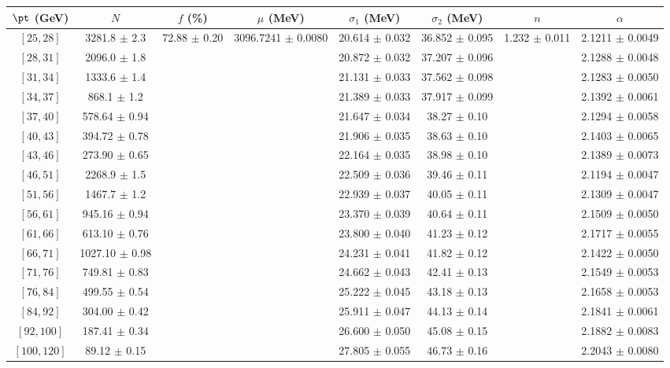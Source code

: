\begin{tabular}{c||c|c|c|c|c|c|c}
$\pt$ (GeV) & $N$ & $f$ (\%) & $\mu$ (MeV) & $\sigma_1$ (MeV) & $\sigma_2$ (MeV) & $n$ & $\alpha$ \\
\hline
$[25, 28]$ & 3281.8 $\pm$ 2.3 & \multirow{17}{*}{72.88 $\pm$ 0.20} & \multirow{17}{*}{3096.7241 $\pm$ 0.0080} & 20.614 $\pm$ 0.032 & 36.852 $\pm$ 0.095 & \multirow{17}{*}{1.232 $\pm$ 0.011} & 2.1211 $\pm$ 0.0049\\
$[28, 31]$ & 2096.0 $\pm$ 1.8 &  &  & 20.872 $\pm$ 0.032 & 37.207 $\pm$ 0.096 &  & 2.1288 $\pm$ 0.0048\\
$[31, 34]$ & 1333.6 $\pm$ 1.4 &  &  & 21.131 $\pm$ 0.033 & 37.562 $\pm$ 0.098 &  & 2.1283 $\pm$ 0.0050\\
$[34, 37]$ & 868.1 $\pm$ 1.2 &  &  & 21.389 $\pm$ 0.033 & 37.917 $\pm$ 0.099 &  & 2.1392 $\pm$ 0.0061\\
$[37, 40]$ & 578.64 $\pm$ 0.94 &  &  & 21.647 $\pm$ 0.034 & 38.27 $\pm$ 0.10 &  & 2.1294 $\pm$ 0.0058\\
$[40, 43]$ & 394.72 $\pm$ 0.78 &  &  & 21.906 $\pm$ 0.035 & 38.63 $\pm$ 0.10 &  & 2.1403 $\pm$ 0.0065\\
$[43, 46]$ & 273.90 $\pm$ 0.65 &  &  & 22.164 $\pm$ 0.035 & 38.98 $\pm$ 0.10 &  & 2.1389 $\pm$ 0.0073\\
$[46, 51]$ & 2268.9 $\pm$ 1.5 &  &  & 22.509 $\pm$ 0.036 & 39.46 $\pm$ 0.11 &  & 2.1194 $\pm$ 0.0047\\
$[51, 56]$ & 1467.7 $\pm$ 1.2 &  &  & 22.939 $\pm$ 0.037 & 40.05 $\pm$ 0.11 &  & 2.1309 $\pm$ 0.0047\\
$[56, 61]$ & 945.16 $\pm$ 0.94 &  &  & 23.370 $\pm$ 0.039 & 40.64 $\pm$ 0.11 &  & 2.1509 $\pm$ 0.0050\\
$[61, 66]$ & 613.10 $\pm$ 0.76 &  &  & 23.800 $\pm$ 0.040 & 41.23 $\pm$ 0.12 &  & 2.1717 $\pm$ 0.0055\\
$[66, 71]$ & 1027.10 $\pm$ 0.98 &  &  & 24.231 $\pm$ 0.041 & 41.82 $\pm$ 0.12 &  & 2.1422 $\pm$ 0.0050\\
$[71, 76]$ & 749.81 $\pm$ 0.83 &  &  & 24.662 $\pm$ 0.043 & 42.41 $\pm$ 0.13 &  & 2.1549 $\pm$ 0.0053\\
$[76, 84]$ & 499.55 $\pm$ 0.54 &  &  & 25.222 $\pm$ 0.045 & 43.18 $\pm$ 0.13 &  & 2.1658 $\pm$ 0.0053\\
$[84, 92]$ & 304.00 $\pm$ 0.42 &  &  & 25.911 $\pm$ 0.047 & 44.13 $\pm$ 0.14 &  & 2.1841 $\pm$ 0.0061\\
$[92, 100]$ & 187.41 $\pm$ 0.34 &  &  & 26.600 $\pm$ 0.050 & 45.08 $\pm$ 0.15 &  & 2.1882 $\pm$ 0.0083\\
$[100, 120]$ & 89.12 $\pm$ 0.15 &  &  & 27.805 $\pm$ 0.055 & 46.73 $\pm$ 0.16 &  & 2.2043 $\pm$ 0.0080\\
\end{tabular}
